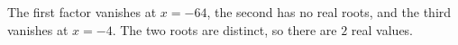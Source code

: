 The first factor vanishes at $x=-64$, the second has no real roots, and the third vanishes at $x=-4$. The two roots are distinct, so there are $\boxed{2}$ real values.
